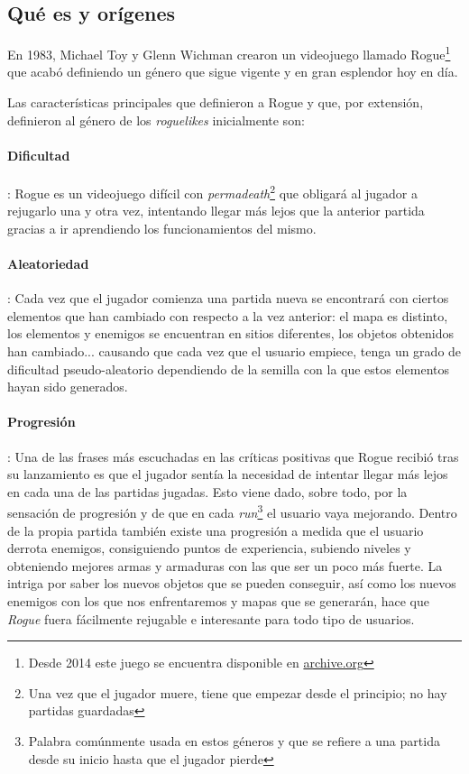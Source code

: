 \subsection{Qué es y orígenes}

En 1983, Michael Toy y Glenn Wichman crearon un videojuego llamado Rogue\footnote{Desde 2014 este juego se encuentra disponible en \href{https://archive.org/details/msdos_Rogue_1983}{archive.org}} que acabó definiendo un género que sigue vigente y en gran esplendor hoy en día.

Las características principales que definieron a Rogue y que, por extensión, definieron al género de los \textit{roguelikes} inicialmente son:

\paragraph{Dificultad}: Rogue es un videojuego difícil con \textit{permadeath}\footnote{Una vez que el jugador muere, tiene que empezar desde el principio; no hay partidas guardadas} que obligará al jugador a rejugarlo una y otra vez, intentando llegar más lejos que la anterior partida gracias a ir aprendiendo los funcionamientos del mismo.

\paragraph{Aleatoriedad}: Cada vez que el jugador comienza una partida nueva se encontrará con ciertos elementos que han cambiado con respecto a la vez anterior: el mapa es distinto, los elementos y enemigos se encuentran en sitios diferentes, los objetos obtenidos han cambiado... causando que cada vez que el usuario empiece, tenga un grado de dificultad pseudo-aleatorio dependiendo de la semilla con la que estos elementos hayan sido generados.

\paragraph{Progresión}: Una de las frases más escuchadas en las críticas positivas que Rogue recibió tras su lanzamiento es que el jugador sentía la necesidad de intentar llegar más lejos en cada una de las partidas jugadas\cite{website:machinesnetworks}. Esto viene dado, sobre todo, por la sensación de progresión y de que en cada \textit{run}\footnote{Palabra comúnmente usada en estos géneros y que se refiere a una partida desde su inicio hasta que el jugador pierde} el usuario vaya mejorando. Dentro de la propia partida también existe una progresión a medida que el usuario derrota enemigos, consiguiendo puntos de experiencia, subiendo niveles y obteniendo mejores armas y armaduras con las que ser un poco más fuerte. La intriga por saber los nuevos objetos que se pueden conseguir, así como los nuevos enemigos con los que nos enfrentaremos y mapas que se generarán, hace que \textit{Rogue} fuera fácilmente rejugable e interesante para todo tipo de usuarios.

